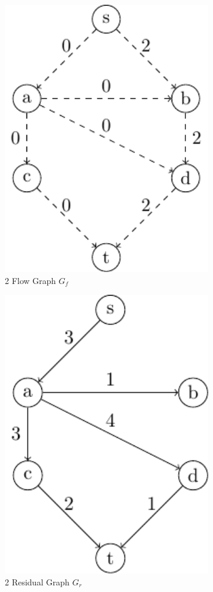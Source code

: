 \begin{minipage}{0.2\textwidth}
\begin{figure}[H]
  \centering
  \includegraphics[width=0.8\textwidth]{Figure/maxflow_d1_4.pdf}
  \caption*{2 Flow Graph \(G_f\)}
\end{figure}
\end{minipage}
\begin{minipage}{0.2\textwidth}
\begin{figure}[H]
  \centering
  \includegraphics[width=0.8\textwidth]{Figure/maxflow_d1_5.pdf}
  \caption*{2 Residual Graph \(G_r\)}
\end{figure}
\end{minipage}

